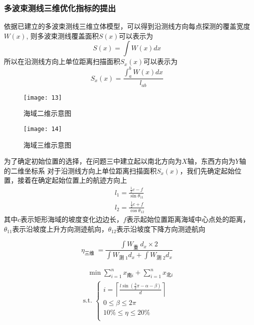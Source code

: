 \documentclass[11pt,twoside,a4paper]{article}
\begin{document}
\subsubsection{多波束测线三维优化指标的提出}
依据已建立的多波束测线三维立体模型，可以得到沿测线方向每点探测的覆盖宽度$W(x)$, 则多波束测线覆盖面积$S(x)$可以表示为
\begin{equation}
	S(x)=\int W(x) d x
\end{equation}
所以在沿测线方向上单位距离扫描面积$S_x(x)$可以表示为
\begin{equation}
	S_x(x)=\frac{\int_a^b W(x) d x}{l_{ab}}
\end{equation}
\begin{figure}[h]
	\centering
	\texttt{[image: 13]}
	\caption{海域二维示意图}
	
\end{figure}
\begin{figure}[h]
	\centering
	\texttt{[image: 14]}
	\caption{海域三维示意图}
	
\end{figure}
为了确定初始位置的选择，在问题三中建立起以南北方向为$X$轴，东西方向为$Y$轴的二维坐标系
对于沿测线方向上单位距离扫描面积$S_x(x)$，我们先确定起始位置，接着在确定起始位置上的航迹方向上
\begin{equation}
	\begin{aligned}
		& l_1=\frac{\frac{1}{2} c-f}{\sin \theta_{11}} \\
		& l_2=\frac{\frac{1}{2} c+f}{\cos \theta_{12}}
	\end{aligned}
\end{equation}
其中$c$表示矩形海域的坡度变化边边长，$f$表示起始位置距离海域中心点处的距离，$\theta_{11}$表示沿坡度上升方向测迹航向，$\theta_{12}$表示沿坡度下降方向测迹航向










\begin{equation}
	\eta_{\text {三维 }}=\frac{\int W_{\text {重 }} d_x \times 2}{\int W_{\text {测 } 1} d_x+\int W_{\text {测 } 2} d_x}
\end{equation}

\begin{gather}
	\quad \min\sum_{i=1}^{n} x_{\text{南}i}+\sum_{i=1}^{n} x_{\text{北}i} \\
	\text { s.t. }\left\{\begin{array}{l}
		 i=\left\lceil\frac{l \sin \left(\frac{3}{2} \pi-\alpha-\beta\right)}{d}\right\rceil \\
		0 \leq \beta \leq 2 \pi\\
		    10\% \leq \eta \leq 20\%                    \\	
	\end{array}\right.
\end{gather}
\end{document}
